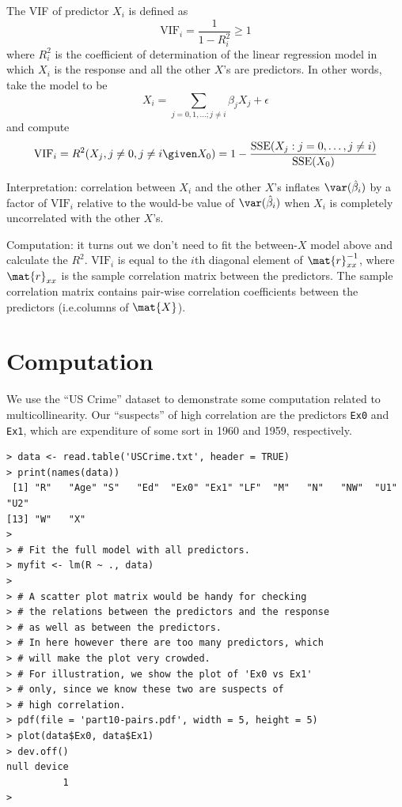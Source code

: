 \documentclass[12pt]{article}
\newcommand{\SSE}{\text{SSE}}
\begin{document}
The VIF of predictor $X_i$ is defined as
\[
\text{VIF}_i = \frac{1}{1 - R^2_i} \ge 1
\]
where $R^2_i$ is the coefficient of determination
of the linear regression model in which
$X_i$ is the response and all the other $X$'s are predictors.
In other words, take the model to be
\[
X_i = \sum_{j=0,1,\dotsc; j\ne i} \beta_j X_j + \epsilon
\]
and compute
\[
\text{VIF}_i
= R^2(X_j, j\ne 0, j\ne i \given X_0)
= 1 - \frac{\SSE(X_j: j=0,\dotsc, j\ne i)}{\SSE(X_0)}
\]


Interpretation:
correlation between $X_i$ and the other $X$'s
inflates $\var(\hat\beta_i)$
by a factor of $\text{VIF}_i$ relative to
the would-be value of $\var(\hat\beta_i)$
when $X_i$ is completely uncorrelated with the other $X$'s.

Computation:
it turns out we don't need to fit the between-$X$ model above
and calculate the $R^2$.
$\text{VIF}_i$ is equal to the $i$th diagonal element of
$\mat{r}_{xx}^{-1}$,
where $\mat{r}_{xx}$ is the sample correlation matrix between the predictors.
The sample correlation matrix contains pair-wise correlation
coefficients between the predictors (i.e.\@ columns of $\mat{X}$).

\section{Computation}

We use the ``US Crime'' dataset to demonstrate some computation
related to multicollinearity.
Our ``suspects'' of high correlation are the predictors
\verb+Ex0+ and \verb+Ex1+, which are expenditure of some sort
in 1960 and 1959, respectively.

\begin{verbatim}
> data <- read.table('USCrime.txt', header = TRUE)
> print(names(data))
 [1] "R"   "Age" "S"   "Ed"  "Ex0" "Ex1" "LF"  "M"   "N"   "NW"  "U1"  "U2" 
[13] "W"   "X"  
> 
> # Fit the full model with all predictors.
> myfit <- lm(R ~ ., data)
> 
> # A scatter plot matrix would be handy for checking
> # the relations between the predictors and the response
> # as well as between the predictors.
> # In here however there are too many predictors, which
> # will make the plot very crowded.
> # For illustration, we show the plot of 'Ex0 vs Ex1'
> # only, since we know these two are suspects of
> # high correlation.
> pdf(file = 'part10-pairs.pdf', width = 5, height = 5)
> plot(data$Ex0, data$Ex1)
> dev.off()
null device 
          1 
> 
\end{verbatim}
\end{document}
